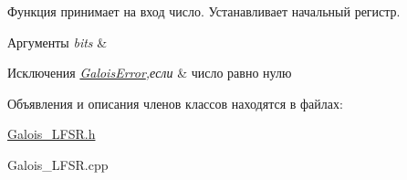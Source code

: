 Функция принимает на вход число. Устанавливает начальный регистр. 


\begin{DoxyParams}{Аргументы}
{\em bits} & \\
\hline
\end{DoxyParams}

\begin{DoxyExceptions}{Исключения}
{\em \hyperlink{classGaloisError}{Galois\+Error},если} & число равно нулю \\
\hline
\end{DoxyExceptions}


Объявления и описания членов классов находятся в файлах\+:\begin{DoxyCompactItemize}
\item 
\hyperlink{Galois__LFSR_8h}{Galois\+\_\+\+L\+F\+S\+R.\+h}\item 
Galois\+\_\+\+L\+F\+S\+R.\+cpp\end{DoxyCompactItemize}
